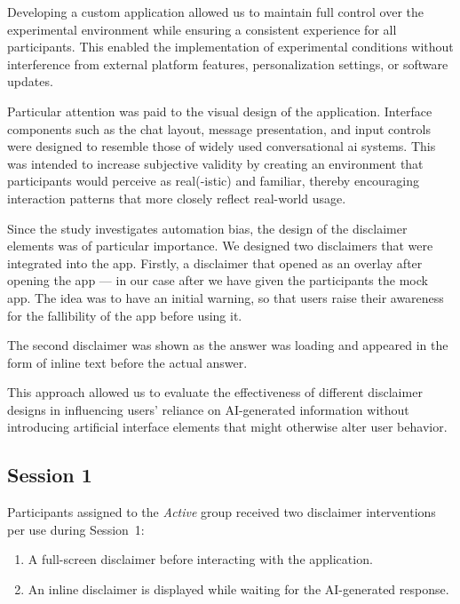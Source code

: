 \documentclass[sigconf,natbib=false]{acmart}
\begin{document}
Developing a custom application allowed us to maintain full control over the experimental environment while ensuring a consistent experience for all participants.
This enabled the implementation of experimental conditions without interference from external platform features, personalization settings, or software updates.

Particular attention was paid to the visual design of the application.
Interface components such as the chat layout, message presentation, and input controls were designed to resemble those of widely used conversational \Gls{ai} systems.
This was intended to increase subjective validity by creating an environment that participants would perceive as real(-istic) and familiar, thereby encouraging interaction patterns that more closely reflect real-world usage.

Since the study investigates automation bias, the design of the disclaimer elements was of particular importance.
We designed two disclaimers that were integrated into the app.
Firstly, a disclaimer that opened as an overlay after opening the app --- in our case after we have given the participants the mock app. The idea was to have an initial warning, so that users raise their awareness for the fallibility of the app before using it. 

The second disclaimer was shown as the answer was loading and appeared in the form of inline text before the actual answer. 

This approach allowed us to evaluate the effectiveness of different disclaimer designs in influencing users' reliance on AI-generated information without introducing artificial interface elements that might otherwise alter user behavior.




\subsection{Session 1}

Participants assigned to the \textit{Active} group received two disclaimer interventions per use during Session~1:

\begin{enumerate}
\item A full-screen disclaimer before interacting with the application.
\item An inline disclaimer is displayed while waiting for the AI-generated response.
\end{enumerate}
\end{document}
